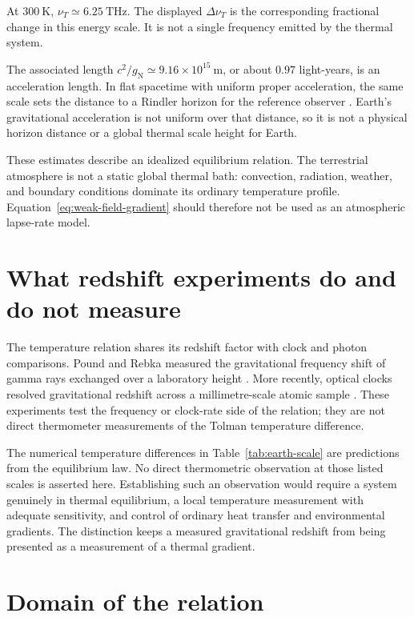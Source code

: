 \documentclass[12pt]{article}
\begin{document}
At $300\ \mathrm{K}$, $\nu_T\simeq6.25\ \mathrm{THz}$. The displayed $\Delta\nu_T$ is the corresponding fractional change in this energy scale. It is not a single frequency emitted by the thermal system.

The associated length $c^2/g_{\mathrm{N}}\simeq9.16\times10^{15}\ \mathrm{m}$, or about $0.97$ light-years, is an acceleration length. In flat spacetime with uniform proper acceleration, the same scale sets the distance to a Rindler horizon for the reference observer \cite{Rindler1966}. Earth's gravitational acceleration is not uniform over that distance, so it is not a physical horizon distance or a global thermal scale height for Earth.

These estimates describe an idealized equilibrium relation. The terrestrial atmosphere is not a static global thermal bath: convection, radiation, weather, and boundary conditions dominate its ordinary temperature profile. Equation~\eqref{eq:weak-field-gradient} should therefore not be used as an atmospheric lapse-rate model.

\section{What redshift experiments do and do not measure}

The temperature relation shares its redshift factor with clock and photon comparisons. Pound and Rebka measured the gravitational frequency shift of gamma rays exchanged over a laboratory height \cite{PoundRebka1960}. More recently, optical clocks resolved gravitational redshift across a millimetre-scale atomic sample \cite{Bothwell2022}. These experiments test the frequency or clock-rate side of the relation; they are not direct thermometer measurements of the Tolman temperature difference.

The numerical temperature differences in Table~\ref{tab:earth-scale} are predictions from the equilibrium law. No direct thermometric observation at those listed scales is asserted here. Establishing such an observation would require a system genuinely in thermal equilibrium, a local temperature measurement with adequate sensitivity, and control of ordinary heat transfer and environmental gradients. The distinction keeps a measured gravitational redshift from being presented as a measurement of a thermal gradient.

\section{Domain of the relation}
\end{document}
